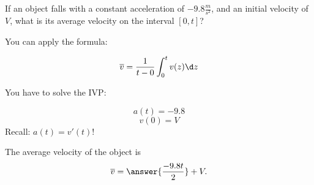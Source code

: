 \documentclass{ximera}
\author{Steven Gubkin\and Nela Lakos}
\begin{document}
\begin{exercise}

If an object falls with a constant acceleration of $-9.8 \frac{m}{s^2}$, and an initial velocity of $V$, what is its average velocity on the interval $[0,t]$?
\begin{hint}
You can apply the formula:

\[
\overline{v}=\frac{1}{t-0}\int_0^{t}v(z)\d z
\]
\end{hint}
\begin{hint}
You have to solve the IVP:

\[
a(t)=-9.8
\]
\[
v(0)=V
\]
Recall: $a(t)=v'(t)$!
\end{hint}
\begin{prompt}
	The average velocity of the object is 
	\[
	\overline{v}=\answer{\frac{-9.8t}{2}}+V.
	\]
\end{prompt}
\end{exercise}
\end{document}
